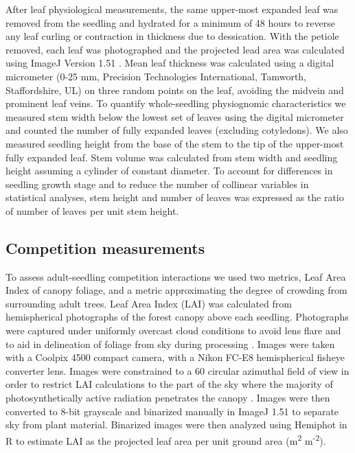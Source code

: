 \documentclass[a4paper, 11pt]{article}
\begin{document}
After leaf physiological measurements, the same upper-most expanded leaf was removed from the seedling and hydrated for a minimum of 48 hours to reverse any leaf curling or contraction in thickness due to dessication. With the petiole removed, each leaf was photographed and the projected lead area was calculated using ImageJ Version 1.51 \citep{Schneider2012}. Mean leaf thickness was calculated using a digital micrometer (0-25 mm, Precision Technologies International, Tamworth, Staffordshire, UL) on three random points on the leaf, avoiding the midvein and prominent leaf veins. To quantify whole-seedling physiognomic characteristics we measured stem width below the lowest set of leaves using the digital micrometer and counted the number of fully expanded leaves (excluding cotyledons). We also measured seedling height from the base of the stem to the tip of the upper-most fully expanded leaf. Stem volume was calculated from stem width and seedling height assuming a cylinder of constant diameter. To account for differences in seedling growth stage and to reduce the number of collinear variables in statistical analyses, stem height and number of leaves was expressed as the ratio of number of leaves per unit stem height.

\subsection{Competition measurements}

To assess adult-seedling competition interactions we used two metrics, Leaf Area Index of canopy foliage, and a metric approximating the degree of crowding from surrounding adult trees. Leaf Area Index (LAI) was calculated from hemispherical photographs of the forest canopy above each seedling. Photographs were captured under uniformly overcast cloud conditions to avoid lens flare and to aid in delineation of foliage from sky during processing \citep{Frazer2001}. Images were taken with a Coolpix 4500 compact camera, with a Nikon FC-E8 hemispherical fisheye converter lens. Images were constrained to a 60\textdegree{} circular azimuthal field of view in order to restrict LAI calculations to the part of the sky where the majority of photosynthetically active radiation penetrates the canopy \citep{Jupp2009, Jonckheere2004}. Images were then converted to 8-bit grayscale and binarized manually in ImageJ 1.51 to separate sky from plant material. Binarized images were then analyzed using Hemiphot \citep{hemiphot} in R to estimate LAI as the projected leaf area per unit ground area (m\textsuperscript{2} m\textsuperscript{-2}).
\end{document}
